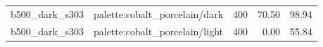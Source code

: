 \begin{longtable}{l>{\raggedright\arraybackslash}p{.42\linewidth}rrr}
b500\_\allowbreak{}dark\_\allowbreak{}s303 & %
palette:cobalt\_\allowbreak{}porcelain/dark & %
400 & %
70.50 & %
98.94 \\ %

b500\_\allowbreak{}dark\_\allowbreak{}s303 & %
palette:cobalt\_\allowbreak{}porcelain/light & %
400 & %
0.00 & %
55.84 \\ %


\end{longtable}
